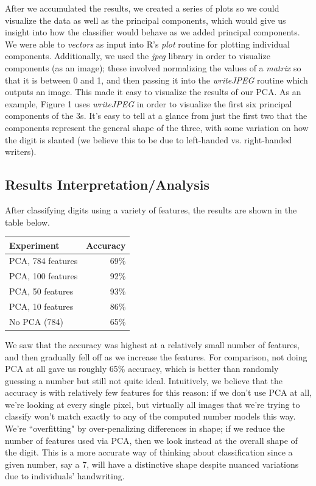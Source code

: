 \documentclass[twocolumn]{article}
\begin{document}
After we accumulated the results, we created a series of plots so we could visualize the data as well as the principal components, which would give us insight into how the classifier would behave as we added principal components. We were able to \emph{vectors} as input into R's \emph{plot} routine for plotting individual components. Additionally, we used the \emph{jpeg} library \cite{writejpeg}
 in order to visualize components (as an image); these involved normalizing the values of a \emph{matrix} so that it is between 0 and 1, and then passing it into the \emph{writeJPEG} routine which outputs an image. This made it easy to visualize the results of our PCA. As an example, Figure 1 uses \emph{writeJPEG} in order to visualize the first six principal components of the 3s. It's easy to tell at a glance from just the first two that the components represent the general shape of the three, with some variation on how the digit is slanted (we believe this to be due to left-handed vs. right-handed writers).

\subsection{Results Interpretation/Analysis}
\label{subsec:interpretation}

After classifying digits using a variety of features, the results are shown in the table below.

\begin{center}
    \begin{tabular}{| l | r |}
        \hline
        \textbf{Experiment} & \textbf{Accuracy} \\ \hline
        PCA, 784 features & 69\% \\ \hline
        PCA, 100 features & 92\% \\ \hline
        PCA, 50 features & 93\% \\ \hline
        PCA, 10 features & 86\% \\ \hline
        No PCA (784) & 65\% \\ \hline
    \end{tabular}
\end{center}

We saw that the accuracy was highest at a relatively small number of features, and then gradually fell off as we increase the features. For comparison, not doing PCA at all gave us roughly 65\% accuracy, which is better than randomly guessing a number but still not quite ideal. Intuitively, we believe that the accuracy is with relatively few features for this reason: if we don't use PCA at all, we're looking at every single pixel, but virtually all images that we're trying to classify won't match exactly to any of the computed number models this way. We're ``overfitting" by over-penalizing differences in shape; if we reduce the number of features used via PCA, then we look instead at the overall shape of the digit. This is a more accurate way of thinking about classification since a given number, say a 7, will have a distinctive shape despite nuanced variations due to individuals' handwriting. 
\end{document}
